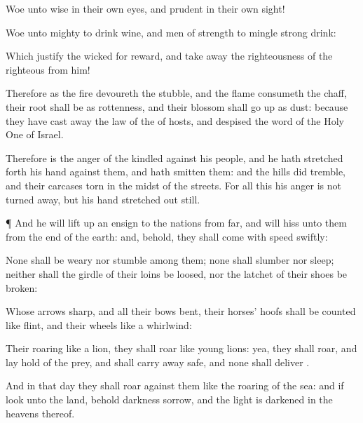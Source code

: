 {Woe unto
{}
wise in their own
eyes, and
prudent in their own
sight!

Woe unto
{}
mighty to
drink
wine, and
men of
strength to
mingle strong
drink:

Which
justify the
wicked
for
reward, and take
away the
righteousness of the
righteous from him!

Therefore as the
fire
devoureth the
stubble, and the
flame
consumeth the
chaff,
{} their
root shall be as
rottenness, and their
blossom shall go
up as
dust: because they have cast
away the
law of the
{} of
hosts, and
despised the
word of the Holy
One of
Israel.

Therefore is the
anger of the
{}
kindled against his
people, and he hath stretched
forth his
hand against them, and hath
smitten them: and the
hills did
tremble, and their
carcases
{}
torn in the
midst of the
streets. For all this his
anger is not turned
away, but his
hand
{} stretched
out still.


\par }{\PP {}¶ And he will lift
up an
ensign to the
nations from
far, and will
hiss unto them from the
end of the
earth: and, behold, they shall
come with
speed
swiftly:

None shall be
weary nor
stumble among them; none shall
slumber nor
sleep; neither shall the
girdle of their
loins be
loosed, nor the
latchet of their
shoes be
broken:

Whose
arrows
{}
sharp, and all their
bows
bent, their
horses’
hoofs shall be
counted like
flint, and their
wheels like a
whirlwind:

Their
roaring
{} like a
lion, they shall
roar like young
lions: yea, they shall
roar, and lay
hold of the
prey, and shall carry
{} away
safe, and none shall
deliver
{}.

And in that
day they shall
roar against them like the
roaring of the
sea: and if
{}
look unto the
land, behold
darkness
{}
sorrow, and the
light is
darkened in the
heavens thereof.




}
